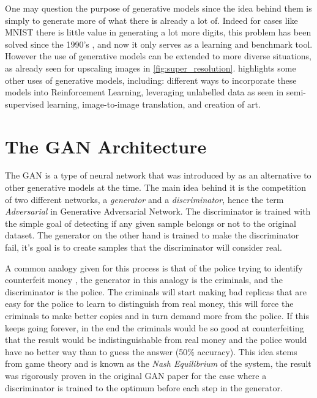 One may question the purpose of generative models since the idea behind them is simply to generate more of what there is already a lot of. Indeed for cases like \gls{MNIST} there is little value in generating a lot more digits, this problem has been solved since the 1990's \cite{mnist1998}, and now it only serves as a learning and benchmark tool. However the use of generative models can be extended to more diverse situations, as already seen for upscaling images in \autoref{fig:super_resolution}. \textcite{nipsGAN2017} highlights some other uses of generative models, including: different ways to incorporate these models into Reinforcement Learning, leveraging unlabelled data as seen in semi-supervised learning, image-to-image translation, and creation of art.


\section{The GAN Architecture} \label{sec:gan_architecture}
The \gls{GAN} is a type of neural network that was introduced by \textcite{gans2014} as an alternative to other generative models at the time. The main idea behind it is the competition of two different networks, a \textit{generator} and a \textit{discriminator}, hence the term \textit{Adversarial} in Generative Adversarial Network. The discriminator is trained with the simple goal of detecting if any given sample belongs or not to the original dataset. The generator on the other hand is trained to make the discriminator fail, it's goal is to create samples that the discriminator will consider real.

A common analogy given for this process is that of the police trying to identify counterfeit money \cite{nipsGAN2017}, the generator in this analogy is the criminals, and the discriminator is the police. The criminals will start making bad replicas that are easy for the police to learn to distinguish from real money, this will force the criminals to make better copies and in turn demand more from the police. If this keeps going forever, in the end the criminals would be so good at counterfeiting that the result would be indistinguishable from real money and the police would have no better way than to guess the answer (50\% accuracy). This idea stems from game theory and is known as the \textit{Nash Equilibrium} of the system, the result was rigorously proven in the original \gls{GAN} paper \cite{gans2014} for the case where a discriminator is trained to the optimum before each step in the generator.

